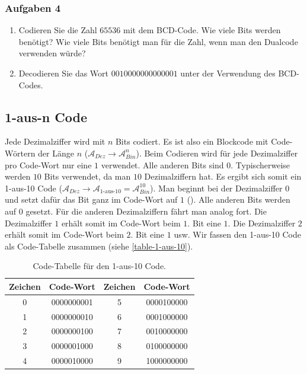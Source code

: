 \subsubsection{Aufgaben 4}

\begin{enumerate}
\item Codieren Sie die Zahl $65536$ mit dem \ac{BCD}-Code. Wie viele Bits werden benötigt? Wie viele Bits benötigt man für die Zahl, wenn man den Dualcode verwenden würde?
\item Decodieren Sie das Wort $0010000000000001$ unter der Verwendung des \ac{BCD}-Codes.
\end{enumerate}

\subsection{1-aus-n Code}

Jede Dezimalziffer wird mit $n$ Bits codiert. Es ist also ein Blockcode mit Code-Wörtern der Länge $n$ ($\mathscr{A}_{Dez} \rightarrow \mathscr{A}_{Bin}^n$). Beim Codieren wird für jede Dezimalziffer pro Code-Wort nur eine $1$ verwendet. Alle anderen Bits sind $0$. Typischerweise werden $10$ Bits verwendet, da man $10$ Dezimalziffern hat. Es ergibt sich somit ein 1-aus-10 Code ($\mathscr{A}_{Dez} \rightarrow \mathscr{A}_{\text{1-aus-10}} = \mathscr{A}_{Bin}^{10}$). Man beginnt bei der Dezimalziffer $0$ und setzt dafür das Bit ganz  im Code-Wort auf $1$ (). Alle anderen Bits werden auf 0 gesetzt. Für die anderen Dezimalziffern fährt man analog fort. Die Dezimalziffer $1$ erhält somit im Code-Wort beim $1$. Bit eine $1$. Die Dezimalziffer $2$ erhält somit im Code-Wort beim $2$. Bit eine $1$ usw. Wir fassen den 1-aus-10 Code als Code-Tabelle zusammen (siehe \autoref{table-1-aus-10}).

\begin{table}[htb]
\centering
\begin{tabular}{|c|c|c|c|}
\hline
Zeichen & Code-Wort & Zeichen & Code-Wort \\ \hline
0       &   0000000001        & 5       &   0000100000        \\ \hline
1       &   0000000010        & 6       &   0001000000        \\ \hline
2       &   0000000100        & 7       &   0010000000        \\ \hline
3       &   0000001000        & 8       &   0100000000        \\ \hline
4       &   0000010000        & 9       &   1000000000        \\ \hline
\end{tabular}
\caption{Code-Tabelle für den 1-aus-10 Code.}
\label{table-1-aus-10}
\end{table}


